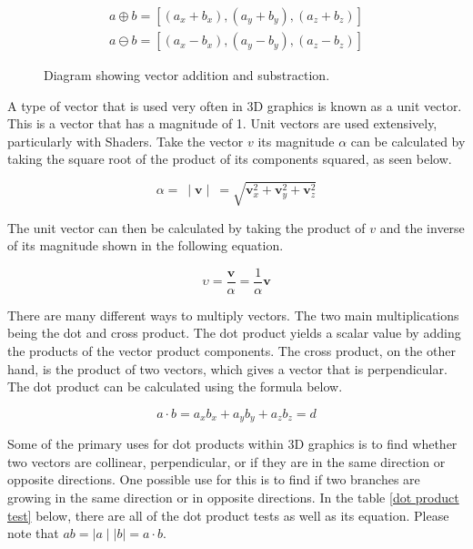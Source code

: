 \begin{equation}
\begin{aligned}
a \oplus b = [(a_x + b_x), (a_y + b_y), (a_z + b_z)]\\
a \ominus b = [(a_x - b_x), (a_y - b_y), (a_z - b_z)]
\end{aligned}
\end{equation}

\begin{figure}[htbp]
	{\centering
		\setlength{\fboxrule}{1pt}
		\vspace{7px}
		\caption{Diagram showing vector addition and substraction.}
	}
\end{figure}
\FloatBarrier

\noindent
A type of vector that is used very often in 3D graphics is known as a unit vector. This is a vector that has a magnitude of 1. Unit vectors are used extensively, particularly with \gls{Shader}s. Take the vector $v$ its magnitude $\alpha$ can be calculated by taking the square root of the product of its components squared, as seen below. 

\begin{equation}
	\alpha =~ \mid \textbf{v} \mid~ = \sqrt{\textbf{v}^2_x + \textbf{v}^2_y + \textbf{v}^2_z}
\end{equation}

\noindent
The unit vector can then be calculated by taking the product of $v$ and the inverse of its magnitude shown in the following equation.

\begin{equation}
	\upsilon = \frac{\textbf{v}}{\alpha} = \frac{1}{\alpha} \textbf{v}
\end{equation}

\noindent
There are many different ways to multiply vectors. The two main multiplications being the dot and cross product. The dot product yields a scalar value by adding the products of the vector product components. The cross product, on the other hand, is the product of two vectors, which gives a vector that is perpendicular. The dot product can be calculated using the formula below.

\begin{equation}
a \cdot b = a_x b_x + a_y b_y + a_z b_z = d
\end{equation}

\noindent
Some of the primary uses for dot products within 3D graphics is to find whether two vectors are collinear, perpendicular, or if they are in the same direction or opposite directions. One possible use for this is to find if two branches are growing in the same direction or in opposite directions. In the table \ref{dot product test} below, there are all of the dot product tests as well as its equation. Please note that $ab = \mid a \mid \mid b \mid = a \cdot b$.

